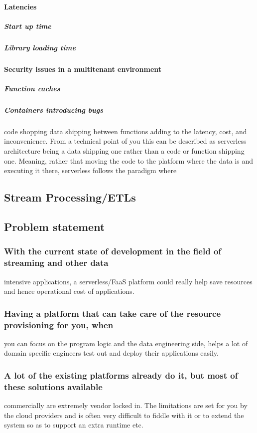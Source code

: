 \documentclass[12pt,titlepage]{article}
\begin{document}
\paragraph{Latencies}
\label{sec:org7c6c6c2}
\subparagraph{Start up time}
\label{sec:org4e6ae1c}
\subparagraph{Library loading time}
\label{sec:org20897cd}
\paragraph{Security issues in a multitenant environment}
\label{sec:org98e68c8}
\subparagraph{Function caches}
\label{sec:orge3c00b8}
\subparagraph{Containers introducing bugs}
\label{sec:org2588392}
code shopping data shipping
between functions adding to the latency, cost, and inconvenience. From a
technical point of you this can be described as serverless architecture being a
data shipping one rather than a code or function shipping one. Meaning, rather
that moving the code to the platform where the data is and executing it there,
serverless follows the paradigm where  
\subsection{Stream Processing/ETLs}
\label{sec:org3e6b8d5}
\subsection{Problem statement}
\label{sec:org86daac4}
\subsubsection{With the current state of development in the field of streaming and other data}
\label{sec:orgb334d3f}
intensive applications, a serverless/FaaS platform could really help save
resources and hence operational cost of applications.
\subsubsection{Having a platform that can take care of the resource provisioning for you, when}
\label{sec:orgb909c28}
you can focus on the program logic and the data engineering side, helps a lot of
domain specific engineers test out and deploy their applications easily.
\subsubsection{A lot of the existing platforms already do it, but most of these solutions available}
\label{sec:org7259571}
commercially are extremely vendor locked in. The limitations are set for you by
the cloud providers and is often very difficult to fiddle with it or to extend
the system so as to support an extra runtime etc.
\end{document}
